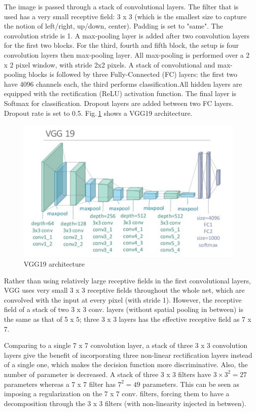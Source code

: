 The image is passed through a stack of convolutional layers. The filter that is used has a very small receptive field: 3 x 3 (which is the smallest size to capture the notion of left/right, up/down, center). Padding is set to "same". The convolution stride is 1. A max-pooling layer is added after two convolution layers for the first two blocks. For the third, fourth and fifth block, the setup is four convolution layers then max-pooling layer. All max-pooling is performed over a 2 x 2 pixel window, with stride 2x2 pixels. A stack of convolutional and max-pooling blocks is followed by three Fully-Connected (FC) layers: the first two have 4096 channels each, the third performs classification.All hidden layers are equipped with the rectification (ReLU) activation function. The final layer is Softmax for classification. Dropout layers are added between two FC layers. Dropout rate is set to 0.5. Fig.\,\ref{VGG} shows a VGG19 architecture.

\begin{figure}[h]
	\centering
	\includegraphics[width=\textwidth]{Figs/vgg.png}
    \caption{VGG19 architecture}
    \label{VGG}
\end{figure}

Rather than using relatively large receptive fields in the first convolutional layers, VGG uses very small 3 x 3 receptive fields throughout the whole net, which are convolved with the input at every pixel (with stride 1). However, the receptive field of a stack of two 3 x 3 conv. layers (without spatial pooling in between) is the same as that of 5 x 5; three 3 x 3 layers has the effective receptive field as 7 x 7. 

Comparing to a single 7 x 7 convolution layer, a stack of three 3 x 3 convolution layers give the benefit of incorporating three non-linear rectification layers instead of a single one, which makes the decision function more discriminative. Also, the number of parameter is decreased. A stack of three 3 x 3 filters have $3\times3^2 = 27$ parameters whereas a 7 x 7 filter has $7^2 = 49$ parameters. This can be seen as imposing a regularization on the 7 x 7 conv. filters, forcing them to have a decomposition through the 3 x 3 filters (with non-linearity injected in between).


